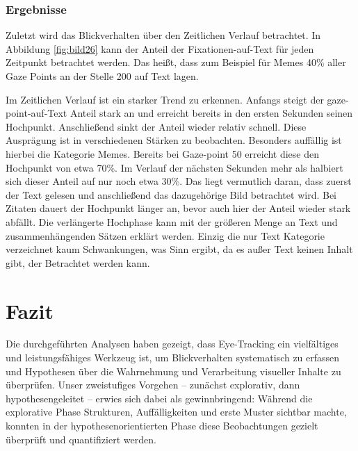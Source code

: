 \documentclass[
    language=german, %
    thesis=seminar, %
    supervisor=postdoc, %
    multiauthor=true, %
    ]{settings/csssa-thesis}
\begin{document}
\subsubsection{Ergebnisse}
Zuletzt wird das Blickverhalten über den Zeitlichen Verlauf betrachtet. In Abbildung \ref{fig:bild26} kann der 
Anteil der Fixationen-auf-Text für jeden Zeitpunkt betrachtet werden. Das heißt, dass zum Beispiel 
für Memes 40\% aller Gaze Points an der Stelle 200 auf Text lagen. 


Im Zeitlichen Verlauf ist ein starker Trend zu erkennen. Anfangs steigt der gaze-point-auf-Text Anteil stark an und erreicht 
bereits in den ersten Sekunden seinen Hochpunkt. Anschließend sinkt der Anteil wieder relativ schnell. 
Diese Ausprägung ist in verschiedenen Stärken zu beobachten. Besonders auffällig ist hierbei die Kategorie Memes. 
Bereits bei Gaze-point 50 erreicht diese den Hochpunkt von etwa 70\%. Im Verlauf der nächsten Sekunden 
mehr als halbiert sich dieser Anteil auf nur noch etwa 30\%. Das liegt vermutlich daran, dass zuerst der Text 
gelesen und anschließend das dazugehörige Bild betrachtet wird. Bei Zitaten dauert der Hochpunkt länger an, 
bevor auch hier der Anteil wieder stark abfällt. Die verlängerte Hochphase kann mit der größeren Menge an Text 
und zusammenhängenden Sätzen erklärt werden. Einzig die nur Text Kategorie verzeichnet kaum Schwankungen, 
was Sinn ergibt, da es außer Text keinen Inhalt gibt, der Betrachtet werden kann. 

\section{Fazit}

Die durchgeführten Analysen haben gezeigt, dass Eye-Tracking ein vielfältiges und leistungsfähiges Werkzeug ist, 
um Blickverhalten systematisch zu erfassen und Hypothesen über die Wahrnehmung und Verarbeitung visueller Inhalte 
zu überprüfen. Unser zweistufiges Vorgehen – zunächst explorativ, dann hypothesengeleitet – erwies sich dabei als 
gewinnbringend: Während die explorative Phase Strukturen, Auffälligkeiten und erste Muster sichtbar machte, 
konnten in der hypothesenorientierten Phase diese Beobachtungen gezielt überprüft und quantifiziert werden. 
\end{document}
